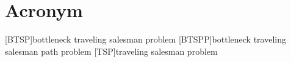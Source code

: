 \chapter{Acronym}
\begin{acronym}
  [BTSP]{bottleneck traveling salesman problem}
  [BTSPP]{bottleneck traveling salesman path problem}
  [TSP]{traveling salesman problem}
\end{acronym}